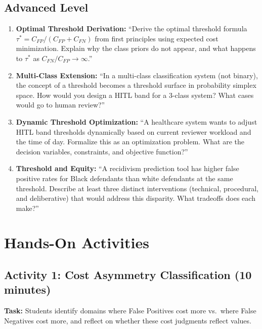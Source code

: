 \subsection{Advanced Level}

\begin{enumerate}
    \item \textbf{Optimal Threshold Derivation:} ``Derive the optimal threshold formula $\tau^* = C_{FP} / (C_{FP} + C_{FN})$ from first principles using expected cost minimization. Explain why the class priors do not appear, and what happens to $\tau^*$ as $C_{FN}/C_{FP} \to \infty$.''

    \item \textbf{Multi-Class Extension:} ``In a multi-class classification system (not binary), the concept of a threshold becomes a threshold surface in probability simplex space. How would you design a HITL band for a 3-class system? What cases would go to human review?''

    \item \textbf{Dynamic Threshold Optimization:} ``A healthcare system wants to adjust HITL band thresholds dynamically based on current reviewer workload and the time of day. Formalize this as an optimization problem. What are the decision variables, constraints, and objective function?''

    \item \textbf{Threshold and Equity:} ``A recidivism prediction tool has higher false positive rates for Black defendants than white defendants at the same threshold. Describe at least three distinct interventions (technical, procedural, and deliberative) that would address this disparity. What tradeoffs does each make?''
\end{enumerate}

\section{Hands-On Activities}

\subsection{Activity 1: Cost Asymmetry Classification (10 minutes)}

\textbf{Task:} Students identify domains where False Positives cost more vs.\ where False Negatives cost more, and reflect on whether these cost judgments reflect values.

